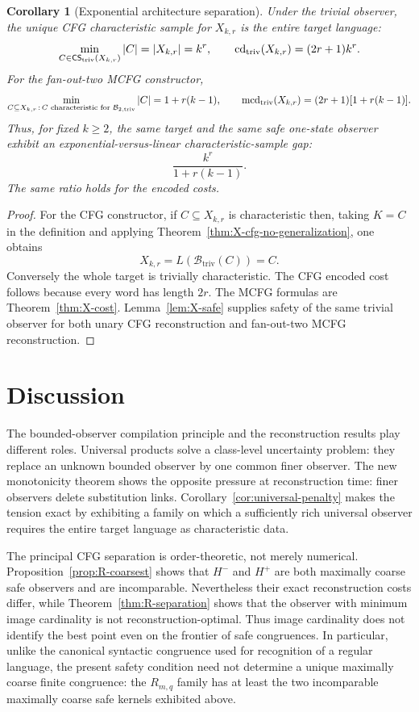 \documentclass[11pt]{article}
\newtheorem{corollary}[theorem]{Corollary}
\theoremstyle{definition}
\theoremstyle{remark}
\newcommand{\cd}{\operatorname{cd}}
\newcommand{\mcd}{\operatorname{mcd}}
\newcommand{\CS}{\mathsf{CS}}
\begin{document}
\begin{corollary}[Exponential architecture separation]
\label{cor:X-architecture-gap}
Under the trivial observer, the unique CFG characteristic sample for
\(X_{k,r}\) is the entire target language:
\[
 \min_{C\in\CS_{\rm triv}(X_{k,r})}|C|
 =|X_{k,r}|=k^r,
 \qquad
 \cd_{\rm triv}(X_{k,r})=(2r+1)k^r.
\]
For the fan-out-two MCFG constructor,
\[
 \min_{C\subseteq X_{k,r}\,:\,C\text{ characteristic for }
       \mathcal B_{2,\rm triv}} |C|
 =1+r(k-1),
 \qquad
 \mcd_{\rm triv}(X_{k,r})
 =(2r+1)[1+r(k-1)].
\]
Thus, for fixed \(k\ge2\), the same target and the same safe one-state
observer exhibit an exponential-versus-linear characteristic-sample gap:
\[
 \frac{k^r}{1+r(k-1)}.
\]
The same ratio holds for the encoded costs.
\end{corollary}

\begin{proof}
For the CFG constructor, if \(C\subseteq X_{k,r}\) is characteristic then,
taking \(K=C\) in the definition and applying
Theorem~\ref{thm:X-cfg-no-generalization}, one obtains
\[
 X_{k,r}=L(\mathcal B_{\mathrm{triv}}(C))=C.
\]
Conversely the whole target is trivially characteristic.  The CFG encoded cost
follows because every word has length \(2r\).  The MCFG formulas are
Theorem~\ref{thm:X-cost}.  Lemma~\ref{lem:X-safe} supplies safety of the same
trivial observer for both unary CFG reconstruction and fan-out-two MCFG
reconstruction.
\end{proof}
\section{Discussion}

The bounded-observer compilation principle and the reconstruction results play
different roles.  Universal products solve a class-level uncertainty problem:
they replace an unknown bounded observer by one common finer observer.  The
new monotonicity theorem shows the opposite pressure at reconstruction time:
finer observers delete substitution links.  Corollary~\ref{cor:universal-penalty}
makes the tension exact by exhibiting a family on which a sufficiently rich
universal observer requires the entire target language as characteristic
data.

The principal CFG separation is order-theoretic, not merely numerical.
Proposition~\ref{prop:R-coarsest} shows that \(H^-\) and \(H^+\) are both
maximally coarse safe observers and are incomparable.  Nevertheless their exact
reconstruction costs differ, while Theorem~\ref{thm:R-separation} shows that
the observer with minimum image cardinality is not reconstruction-optimal.
Thus image cardinality does not identify the best point even on the frontier
of safe congruences.  In particular, unlike the canonical syntactic
congruence used for recognition of a regular language, the present safety
condition need not determine a unique maximally coarse finite congruence: the
\(R_{m,q}\) family has at least the two incomparable maximally coarse safe
kernels exhibited above.
\end{document}
